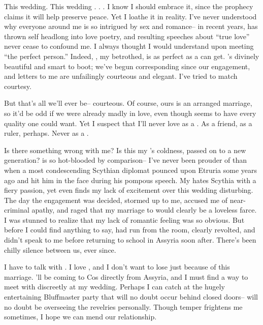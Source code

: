 \documentclass[char]{Kos}
\begin{document}
This wedding. This wedding . . . I know I should embrace it, since the prophecy claims it will help preserve peace. Yet I loathe it in reality. I've never understood why everyone around me is so intrigued by sex and romance-- in recent years, \cPoet{} has thrown \cPoet{\them}self headlong into love poetry, and \cPoet{\their} resulting speeches about ``true love'' never cease to confound me. I always thought I would understand upon meeting ``the perfect person.'' Indeed, \cBride{}, my betrothed, is as perfect as a \cBride{\human} can get. \cBride{\They}'s divinely beautiful and smart to boot; we've begun corresponding since our engagement, and \cBride{\their} letters to me are unfailingly courteous and elegant. I've tried to match \cBride{\their} courtesy. 

But that's all we'll ever be-- courteous. Of course, ours is an arranged marriage, so it'd be odd if we were already madly in love, even though \cBride{\they} seems to have every quality one could want. Yet I suspect that I'll never love \cBride{\them} as a \cBride{\spouse}. As a friend, as a ruler, perhaps. Never as a \cBride{\spouse}.

Is there something wrong with me? Is this my \cEtruriaKing{\parent}'s coldness, passed on to a new generation? \cPoet{} is so hot-blooded by comparison-- I've never been prouder of \cPoet{\them} than when a most condescending Scythian diplomat pounced upon Etruria some years ago and \cPoet{\they} hit him in the face during his pompous speech. My \cPoet{\sibling} hates Scythia with a fiery passion, yet even \cPoet{\they} finds my lack of excitement over this wedding disturbing. The day the engagement was decided, \cPoet{\they} stormed up to me, accused me of near-criminal apathy, and raged that my marriage to \cBride{} would clearly be a loveless farce. I was stunned to realize that my lack of romantic feeling was so obvious. But before I could find anything to say, \cPoet{} had run from the room, clearly revolted, and \cPoet{\they} didn't speak to me before returning to school in Assyria soon after. There's been chilly silence between us, ever since.

I have to talk with \cPoet{}. I love \cPoet{\them}, and I don't want to lose \cPoet{\them} just because of this marriage. \cPoet{\They}'ll be coming to Cos directly from Assyria, and I must find a way to meet with \cPoet{\them} discreetly at my wedding. Perhaps I can catch \cPoet{\them} at the hugely entertaining Bluffmaster party that will no doubt occur behind closed doors-- \cPoet{} will no doubt be overseeing the revelries personally. Though \cPoet{\their} temper frightens me sometimes, I hope we can mend our relationship.
\end{document}
